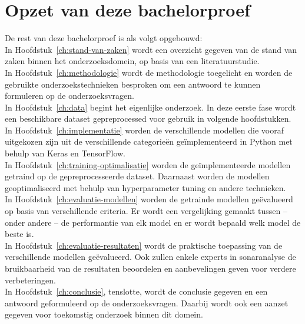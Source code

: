 \section{Opzet van deze bachelorproef}%
\label{sec:opzet-bachelorproef}

De rest van deze bachelorproef is als volgt opgebouwd: \\

In Hoofdstuk~\ref{ch:stand-van-zaken} wordt een overzicht gegeven van de stand van zaken binnen het onderzoeksdomein, op basis van een literatuurstudie. \\

In Hoofdstuk~\ref{ch:methodologie} wordt de methodologie toegelicht en worden de gebruikte onderzoekstechnieken besproken om een antwoord te kunnen formuleren op de onderzoeksvragen. \\

In Hoofdstuk~\ref{ch:data} begint het eigenlijke onderzoek. In deze eerste fase wordt een beschikbare dataset gepreprocessed voor gebruik in volgende hoofdstukken. \\

In Hoofdstuk~\ref{ch:implementatie} worden de verschillende modellen die vooraf uitgekozen zijn uit de verschillende categorieën geïmplementeerd in Python met behulp van Keras en TensorFlow. \\

In Hoofdstuk~\ref{ch:training-optimalisatie} worden de geïmplementeerde modellen getraind op de gepreprocesseerde dataset. Daarnaast worden de modellen geoptimaliseerd met behulp van hyperparameter tuning en andere technieken. \\

In Hoofdstuk~\ref{ch:evaluatie-modellen} worden de getrainde modellen geëvalueerd op basis van verschillende criteria. Er wordt een vergelijking gemaakt tussen -- onder andere -- de performantie van elk model en er wordt bepaald welk model de beste is. \\

In Hoofdstuk~\ref{ch:evaluatie-resultaten} wordt de praktische toepassing van de verschillende modellen geëvalueerd. Ook zullen enkele experts in sonaranalyse de bruikbaarheid van de resultaten beoordelen en aanbevelingen geven voor verdere verbeteringen. \\

In Hoofdstuk~\ref{ch:conclusie}, tenslotte, wordt de conclusie gegeven en een antwoord geformuleerd op de onderzoeksvragen. Daarbij wordt ook een aanzet gegeven voor toekomstig onderzoek binnen dit domein.